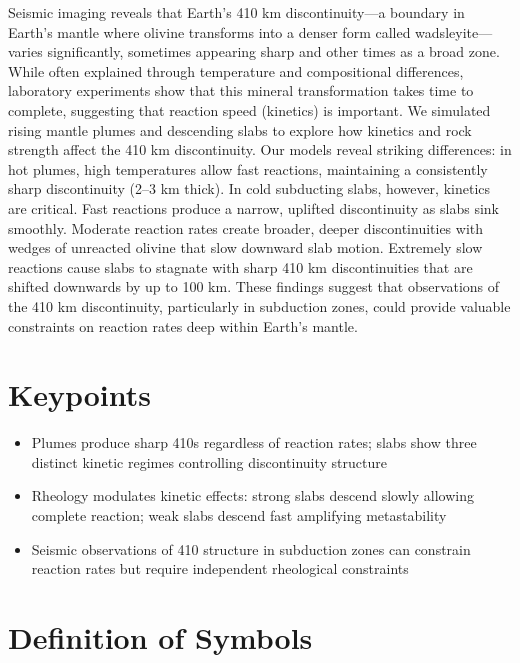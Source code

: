 \documentclass[
  paper=a4,
  ,captions=tableheading
]{scrartcl}
\providecommand{\tightlist}{%
  \setlength{\itemsep}{0pt}\setlength{\parskip}{0pt}}
\begin{document}
Seismic imaging reveals that Earth's 410 km discontinuity---a boundary
in Earth's mantle where olivine transforms into a denser form called
wadsleyite---varies significantly, sometimes appearing sharp and other
times as a broad zone. While often explained through temperature and
compositional differences, laboratory experiments show that this mineral
transformation takes time to complete, suggesting that reaction speed
(kinetics) is important. We simulated rising mantle plumes and
descending slabs to explore how kinetics and rock strength affect the
410 km discontinuity. Our models reveal striking differences: in hot
plumes, high temperatures allow fast reactions, maintaining a
consistently sharp discontinuity (2--3 km thick). In cold subducting
slabs, however, kinetics are critical. Fast reactions produce a narrow,
uplifted discontinuity as slabs sink smoothly. Moderate reaction rates
create broader, deeper discontinuities with wedges of unreacted olivine
that slow downward slab motion. Extremely slow reactions cause slabs to
stagnate with sharp 410 km discontinuities that are shifted downwards by
up to 100 km. These findings suggest that observations of the 410 km
discontinuity, particularly in subduction zones, could provide valuable
constraints on reaction rates deep within Earth's mantle.

\section*{Keypoints}\label{sec:key-points}

\begin{itemize}
\tightlist
\item
  Plumes produce sharp 410s regardless of reaction rates; slabs show
  three distinct kinetic regimes controlling discontinuity structure
\item
  Rheology modulates kinetic effects: strong slabs descend slowly
  allowing complete reaction; weak slabs descend fast amplifying
  metastability
\item
  Seismic observations of 410 structure in subduction zones can
  constrain reaction rates but require independent rheological
  constraints
\end{itemize}

\clearpage

\section*{Definition of Symbols}\label{sec:symbols}
\end{document}
